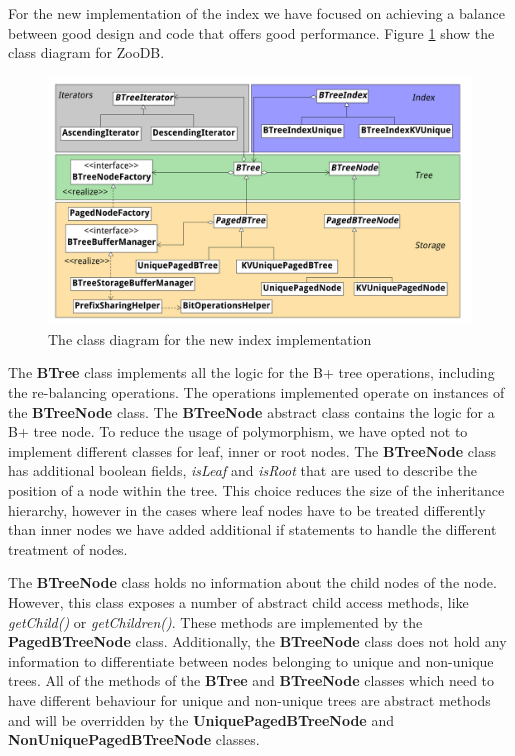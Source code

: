 \documentclass[11pt,a4paper,oneside]{article}
\begin{document}
For the new implementation of the index we have focused on achieving a balance between good design and code that offers good performance. Figure \ref{fig:class-diagram} show the class diagram for ZooDB.  
\begin{figure}[ht]
\includegraphics[scale=0.089, center]{ZooDBClassDiagram} 
\caption{The class diagram for the new index implementation}
\label{fig:class-diagram}
\end{figure}

The \textbf{BTree} class implements all the logic for the B+ tree operations, including the re-balancing operations. The operations implemented operate on instances of the \textbf{BTreeNode} class. The \textbf{BTreeNode} abstract class contains the logic for a B+ tree node. To reduce the usage of polymorphism, we have opted not to implement different classes for leaf, inner or root nodes. The \textbf{BTreeNode} class has additional boolean fields, \textit{isLeaf} and \textit{isRoot} that are used to describe the position of a node within the tree. This choice reduces the size of the inheritance hierarchy, however in the cases where leaf nodes have to be treated differently than inner nodes we have added additional if statements to handle the different treatment of nodes. 

The \textbf{BTreeNode} class holds no information about the child nodes of the node. However, this class exposes a number of abstract child access methods, like \textit{getChild()} or \textit{getChildren()}. These methods are implemented by the \textbf{PagedBTreeNode} class. Additionally, the \textbf{BTreeNode} class does not hold any information to differentiate between nodes belonging to unique and non-unique trees. All of the methods of the \textbf{BTree} and \textbf{BTreeNode} classes which need to have different behaviour for unique and non-unique trees are abstract methods and will be overridden by the \textbf{UniquePagedBTreeNode} and \textbf{NonUniquePagedBTreeNode} classes.
\end{document}
